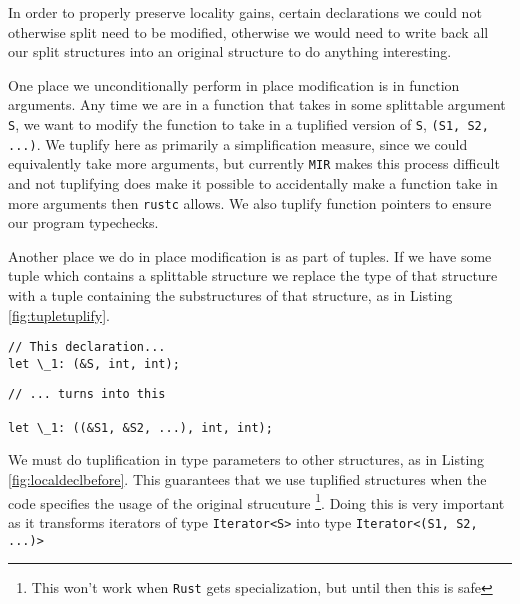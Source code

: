 \documentclass[prodmode,acmtecs]{acmsmall} %
\newcommand{\rustname}{{\texttt{Rust}}}
\def \rust {\rustname{}\xspace}
\newcommand{\rustcname}{{\texttt{rustc}}}
\def \rustc {\rustcname{}\xspace}
\newcommand{\mirname}{{\texttt{MIR}}}
\def \mir {\mirname{}\xspace}
\begin{document}
In order to properly preserve locality gains, certain declarations
we could not otherwise split need to be modified, otherwise we would need
to write back all our split structures into an original structure to
do anything interesting.

One place we unconditionally perform in place modification is in function
arguments. Any time we are in a function that takes in some splittable
argument \texttt{S}, we want to modify the function to take 
in a tuplified version of \texttt{S}, \texttt{(S1, S2, ...)}. 
We tuplify here as primarily a simplification measure, since 
we could equivalently take more arguments, but currently
\mir makes this process difficult and
not tuplifying does make it possible to accidentally make a function
take in more arguments then \rustc allows.
We also tuplify function pointers to ensure our program typechecks.

Another place we do in place modification is as part of tuples. If we have some
tuple which contains a splittable structure we replace the type of that
structure with a tuple containing the substructures of that structure, as 
in Listing \ref{fig:tupletuplify}.

\begin{figure*}[p]
  \begin{minipage}[t]{0.5\linewidth}
\begin{verbatim}
// This declaration...
let \_1: (&S, int, int);
\end{verbatim}
  \end{minipage}
  \begin{minipage}[t]{0.5\linewidth}
\begin{verbatim}
// ... turns into this

let \_1: ((&S1, &S2, ...), int, int);
\end{verbatim}
  \end{minipage}
  \caption{Tuple Modification}
  \label{fig:tupletuplify}
\end{figure*}

We must do tuplification in type parameters to other structures,
as in Listing \ref{fig:localdeclbefore}.
This guarantees that we use tuplified structures
when the code specifies the usage of the original strucuture
\footnote{This won't work when \rust gets specialization, 
but until then this is safe}.
Doing this is very important as it transforms iterators
of type \texttt{Iterator<S>} into type \texttt{Iterator<(S1, S2, ...)>}
\end{document}
